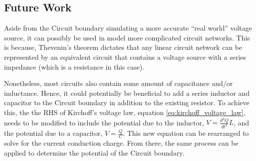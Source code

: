 \subsection{Future Work}

Aside from the Circuit boundary simulating a more accurate “real world” voltage source, it can possibly be used in model more complicated circuit networks. This is because, Thevenin's theorem dictates that any linear circuit network can be represented by an equivalent circuit that contains a voltage source with a series impedance (which is a resistance in this case). 

Nonetheless, most circuits also contain some amount of capacitance and/or inductance. Hence, it could potentially be beneficial to add a series inductor and capacitor to the Circuit boundary in addition to the existing resistor. To achieve this, the the RHS of Kirchoff's voltage law, equation \ref{eq:kirchoff_voltage_law}, needs to be modified to include the potential due to the inductor, $V = \frac{d^2Q}{dt^2} L$, and the potential due to a capacitor, $V = \frac{Q}{C}$. This new equation can be rearranged to solve for the current conduction charge. From there, the same process can be applied to determine the potential of the Circuit boundary.